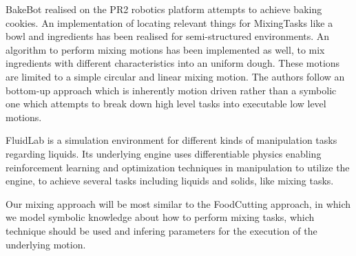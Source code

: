 BakeBot realised on the PR2 robotics platform attempts to achieve baking cookies. An implementation of locating relevant things for MixingTasks
like a bowl and ingredients has been realised for semi-structured environments. An algorithm to perform mixing motions has been implemented as well, to mix 
ingredients with different characteristics into an uniform dough. These motions are limited to a simple circular and linear mixing motion.
The authors follow an bottom-up approach which is inherently motion driven rather than a
symbolic one which attempts to break down high level tasks into executable low level motions. 

FluidLab is a simulation environment for different kinds of manipulation tasks regarding liquids. Its underlying engine uses differentiable physics 
enabling reinforcement learning and optimization techniques in manipulation to utilize the engine, to achieve several tasks 
including liquids and solids, like mixing tasks. 

Our mixing approach will be most similar to the FoodCutting approach, in which we model symbolic knowledge about how to perform
mixing tasks, which technique should be used and infering parameters for the execution of the underlying motion.

